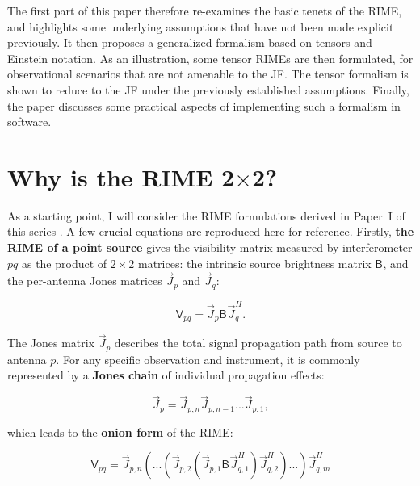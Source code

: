 \documentclass[]{aa}
\newcommand{\herm}{H}
\newcommand{\jones}[2]{\vec {#1}_{#2}}
\newcommand{\jonesT}[2]{\vec {#1}^{\herm}_{#2}}
\newcommand{\coh}[2]{\mathsf{{#1}}_{{#2}}}
\begin{document}
The first part of this paper therefore re-examines the basic tenets of the RIME, and highlights some underlying assumptions that have not been made explicit previously. It then proposes a generalized formalism based on tensors and Einstein notation. As an illustration, some tensor RIMEs are then formulated, for observational scenarios that are not amenable to the JF. The tensor formalism is shown to reduce to the JF under the previously established assumptions. Finally, the paper discusses some practical aspects of implementing such a formalism in software.

\section{Why is the RIME 2$\times$2?}
\label{sec:2x2}

As a starting point, I will consider the RIME formulations derived in Paper~I of this series \citep{RRIME1}. A few crucial equations are reproduced here for reference. Firstly, {\bf the RIME of a point source} gives the visibility matrix measured by interferometer $pq$ as the product of $2\times2$ matrices: the intrinsic source brightness matrix $\coh{B}{}$, and the per-antenna Jones matrices $\jones{J}{p}$ and $\jones{J}{q}$:

\begin{equation}
  \label{eq:rime-ps}
    \coh{V}{pq} = \jones{J}{p} \coh{B}{}  \jonesT{J}{q}.
\end{equation}

The Jones matrix $\jones{J}{p}$ describes the total signal propagation path from source to antenna $p$. For any specific observation and instrument, it is commonly represented by a {\bf Jones chain} of individual propagation effects:

\begin{equation}
  \label{eq:jones-chain}
  \jones{J}{p} = \jones{J}{p,n} \jones{J}{p,n-1} ... \jones{J}{p,1},
\end{equation}

which leads to the {\bf onion form} of the RIME:

\begin{equation}
  \label{eq:rime-onion}
   \coh{V}{pq} = \jones{J}{p,n}(...(\jones{J}{p,2} (\jones{J}{p,1} \coh{B}{}  \jones{J}{q,1}^\herm)\jonesT{J}{q,2}) ... )\jonesT{J}{q,m}
\end{equation}
\end{document}
